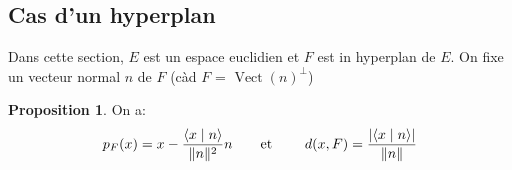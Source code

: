 \documentclass[10pt,a4paper]{article}
\theoremstyle{definition}
\newtheorem{proposition}{Proposition}[section]
\DeclareMathOperator{\vect}{Vect}
\newcommand{\vp}[2]{\left< #1 \mid #2 \right>}
\begin{document}
\subsection{Cas d'un hyperplan}
Dans cette section, $E$ est un espace euclidien et $F$ est in hyperplan de $E$. On fixe un vecteur normal $n$ de $F$ (càd $F$ = $\vect(n)^\perp$)
\begin{proposition}
On a:
\[ p_F(x) = x - \frac{\vp{x}{n}}{\lVert n \rVert^2} n \text{\quad \quad et \quad \quad} d(x, F) = \frac{\left| \vp{x}{n} \right|}{\lVert n \rVert} \]
\end{proposition}
\end{document}
